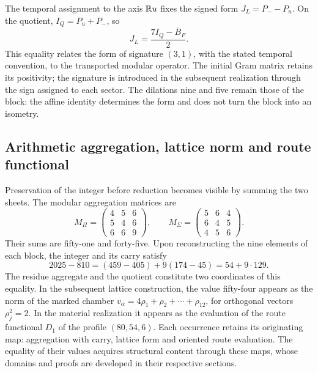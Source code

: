 The temporal assignment to the axis \(\mathbb R u\) fixes the signed form
\(J_L=P_--P_u\). On the quotient, \(I_Q=P_u+P_-\), so
\[
 J_L=\frac{7I_Q-\overline B_F}{2}.
\]
This equality relates the form of signature \((3,1)\), with the
stated temporal convention, to the transported modular operator. The
initial Gram matrix retains its positivity; the signature is introduced
in the subsequent realization through the sign assigned to each sector.
The dilations nine and five remain those of the block: the affine
identity determines the form and does not turn the block into an isometry.

\subsection{Arithmetic aggregation, lattice norm and route functional}
Preservation of the integer before reduction becomes visible by summing
the two sheets. The modular aggregation matrices are
\[
 M_\Pi=\begin{pmatrix}4&5&6\\5&4&6\\6&6&9\end{pmatrix},\qquad
 M_\Sigma=\begin{pmatrix}5&6&4\\6&4&5\\4&5&6\end{pmatrix}.
\]
Their sums are fifty-one and forty-five. Upon reconstructing the
nine elements of each block, the integer and its carry satisfy
\[
 2025-810=(459-405)+9(174-45)=54+9\cdot129.
\]
The residue aggregate and the quotient constitute two coordinates of this
equality. In the subsequent lattice construction, the value fifty-four
appears as the norm of the marked chamber
\(v_\alpha=4\rho_1+\rho_2+\cdots+\rho_{12}\), for orthogonal
vectors \(\rho_j^2=2\). In the material realization it appears as
the evaluation of the route functional \(D_1\) of the profile \((80,54,6)\).
Each occurrence retains its originating map: aggregation with carry,
lattice form and oriented route evaluation. The equality of their
values acquires structural content through these maps, whose
domains and proofs are developed in their respective sections.
